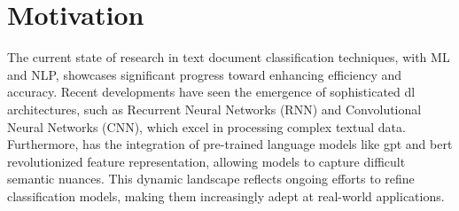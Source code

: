 \section{Motivation}

The current state of research in text document classification techniques, with ML and NLP, showcases significant progress toward enhancing efficiency and accuracy. Recent developments have seen the emergence of sophisticated \acf{dl} architectures, such as Recurrent Neural Networks (RNN) and Convolutional Neural Networks (CNN), which excel in processing complex textual data. Furthermore, has the integration of pre-trained language models like \ac{gpt} and \ac{bert} revolutionized feature representation, allowing models to capture difficult semantic nuances. This dynamic landscape reflects ongoing efforts to refine classification models, making them increasingly adept at real-world applications.











